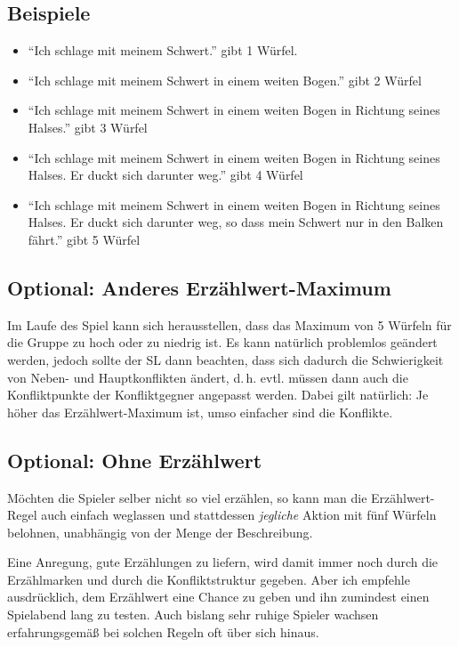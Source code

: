\subsection{Beispiele}
\begin{beispiel}
\begin{itemize}
\item ``Ich schlage mit meinem Schwert.'' gibt 1 Würfel.
\item ``Ich schlage mit meinem Schwert in einem weiten Bogen.'' gibt 2 Würfel
\item ``Ich schlage mit meinem Schwert in einem weiten Bogen in Richtung seines Halses.'' gibt 3 Würfel
\item ``Ich schlage mit meinem Schwert in einem weiten Bogen in Richtung seines Halses. Er duckt sich darunter weg.'' gibt 4 Würfel
\item ``Ich schlage mit meinem Schwert in einem weiten Bogen in Richtung seines Halses. Er duckt sich darunter weg, so dass mein Schwert nur in den Balken fährt.'' gibt 5 Würfel
\end{itemize}
\end{beispiel}

\begin{optional}
\section{Optional: Anderes Erzählwert-Maximum}

Im Laufe des Spiel kann sich herausstellen, dass das Maximum von 5 Würfeln für die Gruppe zu hoch oder zu niedrig ist. Es kann natürlich problemlos geändert werden, jedoch sollte der SL dann beachten, dass sich dadurch die Schwierigkeit von Neben- und Hauptkonflikten ändert, d.\,h. evtl. müssen dann auch die Konfliktpunkte der Konfliktgegner angepasst werden. Dabei gilt natürlich: Je höher das Erzählwert-Maximum ist, umso einfacher sind die Konflikte.
\end{optional}

\begin{optional}
\section{Optional: Ohne Erzählwert}

Möchten die Spieler selber nicht so viel erzählen, so kann man die Erzählwert-Regel auch einfach weglassen und stattdessen \emph{jegliche} Aktion mit fünf Würfeln belohnen, unabhängig von der Menge der Beschreibung.

Eine Anregung, gute Erzählungen zu liefern, wird damit immer noch durch die Erzählmarken und durch die Konfliktstruktur gegeben. Aber ich empfehle ausdrücklich, dem Erzählwert eine Chance zu geben und ihn zumindest einen Spielabend lang zu testen. Auch bislang sehr ruhige Spieler wachsen erfahrungsgemäß bei solchen Regeln oft über sich hinaus.
\end{optional}

